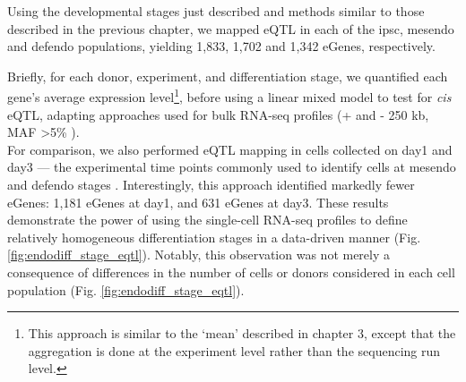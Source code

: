 Using the developmental stages just described and methods similar to those described in the previous chapter, we mapped eQTL in each of the \gls{ipsc}, mesendo and defendo populations, yielding 1,833, 1,702 and 1,342 eGenes, respectively. 

Briefly, for each donor, experiment, and differentiation stage, we quantified each gene’s average expression level\footnote{This approach is similar to the `mean' described in chapter 3, except that the aggregation is done at the experiment level rather than the sequencing run level.}, before using a linear mixed model to test for \textit{cis} eQTL, adapting approaches used for bulk RNA-seq profiles (+ and - 250 kb, MAF >5\% \cite{kilpinen2017common}).\\

For comparison, we also performed eQTL mapping in cells collected on day1 and day3 — the experimental time points commonly used to identify cells at mesendo and defendo stages \cite{hannan2013production}.
Interestingly, this approach identified markedly fewer eGenes: 1,181 eGenes at day1, and 631 eGenes at day3.
These results demonstrate the power of using the single-cell RNA-seq profiles to define relatively homogeneous differentiation stages in a data-driven manner (Fig. \ref{fig:endodiff_stage_eqtl}). 
Notably, this observation was not merely a consequence of differences in the number of cells or donors considered in each cell population (Fig. \ref{fig:endodiff_stage_eqtl}).

